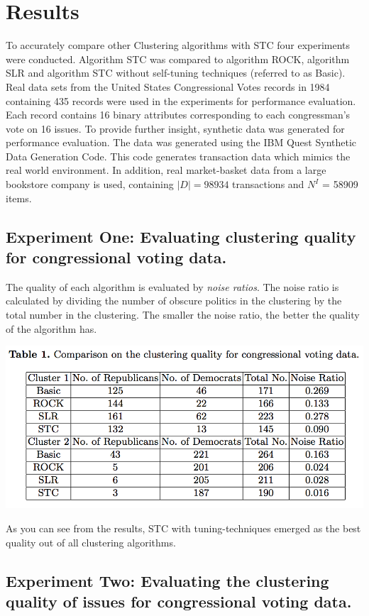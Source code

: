 \documentclass[11pt,reqno]{amsart}
\theoremstyle{definition}
\numberwithin{equation}{subsection}
\begin{document}
\section{Results}
To accurately compare other Clustering algorithms with STC four experiments were conducted. Algorithm STC was compared to algorithm ROCK, algorithm SLR and algorithm STC without self-tuning techniques (referred to as Basic). Real data sets from the United States Congressional Votes records in 1984 containing 435 records were used in the experiments for performance evaluation. Each record contains 16 binary attributes corresponding to each congressman's vote on 16 issues. To provide further insight, synthetic data was generated for performance evaluation. The data was generated using the IBM Quest Synthetic Data Generation Code. This code generates transaction data which mimics the real world environment. In addition, real market-basket data from a large bookstore company is used, containing $|D| = 98934$ transactions and $N^I$ = 58909 items.

\subsection{Experiment One: Evaluating clustering quality for congressional voting data.}

The quality of each algorithm is evaluated by \textit{noise ratios}. The noise ratio is calculated by dividing the number of obscure politics in the clustering by the total number in the clustering. The smaller the noise ratio, the better the quality of the algorithm has.


\includegraphics[scale=.75]{pic1}


As you can see from the results, STC with tuning-techniques emerged as the best quality out of all clustering algorithms.


\subsection{Experiment Two: Evaluating the clustering quality of issues for congressional voting data.} 
\end{document}
